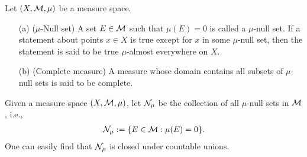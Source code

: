 \begin{defi}
    Let $(X, {\mathcal{M}}, \mu)$ be a measure space.
    \begin{enumerate}
        \item[(a)]
        {
            ($\mu$-Null set)
            A set $E\in{\mathcal{M}}$ such that $\mu(E)=0$ is called a $\mu$-null set.
            If a statement about points $x\in X$ is true except for $x$ in some $\mu$-null set, then the statement is said to be true $\mu$-almost everywhere on $X$.
        }
        \item[(b)]
        {
            (Complete measure)
            A measure whose domain contains all subsets of $\mu$-null sets is said to be complete.
        }
    \end{enumerate}
\end{defi}
\begin{nota}
    Given a measure space $(X, {\mathcal{M}}, \mu)$, let ${\mathcal{N}}_\mu$ be the collection of all $\mu$-null sets in ${\mathcal{M}}$, i.e.,
    \begin{eqnarray*}
        {\mathcal{N}}_\mu:=\{E\in{\mathcal{M}}: \mu(E)=0\}.
    \end{eqnarray*}
    One can easily find that ${\mathcal{N}}_\mu$ is closed under countable unions.
\end{nota}

